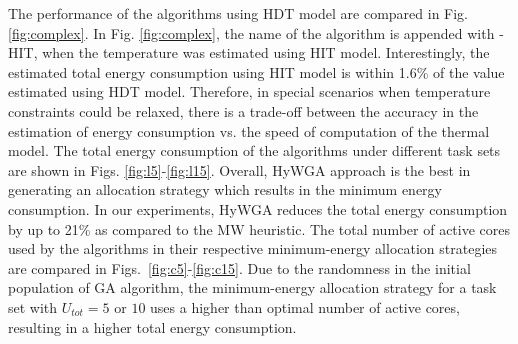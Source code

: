 \documentclass[conference]{IEEEtran}
\begin{document}
%





The performance of the algorithms using HDT model are compared in Fig. \ref{fig:complex}.
In Fig. \ref{fig:complex}, the name of the algorithm is appended with -HIT, when the temperature was estimated using  HIT model.
Interestingly, the estimated total energy consumption using HIT model is  within 1.6\% of the value estimated using HDT model. 
Therefore, in special scenarios when temperature constraints could be relaxed, there is a trade-off between the accuracy in the estimation of energy consumption vs. the speed of computation of the thermal model.
The total energy consumption of the algorithms under different task sets are shown in Figs. \ref{fig:l5}-\ref{fig:l15}.
Overall, HyWGA approach is the best in generating an allocation strategy which results in the minimum energy consumption.
In our experiments, HyWGA reduces the total energy consumption by up to 21\% as compared to the MW heuristic.
The total number of active cores used by the algorithms in their respective minimum-energy allocation strategies
are compared in Figs.~\ref{fig:c5}-\ref{fig:c15}.
Due to the randomness in the initial population of GA algorithm, the minimum-energy allocation strategy for a task set with $U_{tot}=5$ or $10$  
uses a higher than optimal number of active cores, resulting in a higher total energy consumption. %
\end{document}
